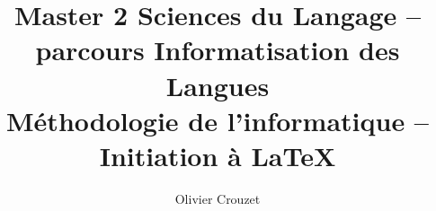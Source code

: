 


\title{\Huge Master 2 \og Sciences du Langage \fg -- parcours \og Informatisation des Langues \fg\\
  Méthodologie de l'informatique -- Initiation à \LaTeX}
\author{Olivier Crouzet}




